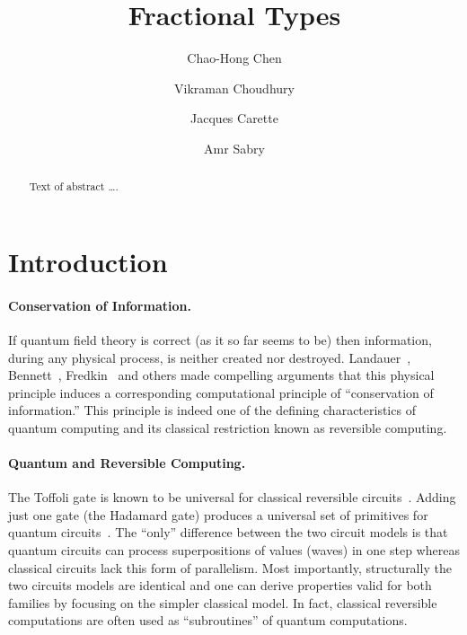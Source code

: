 \documentclass[sigplan,10pt,review,anonymous]{acmart}
\begin{document}
\title{Fractional Types}
\author{Chao-Hong Chen}

\author{Vikraman Choudhury}

\author{Jacques Carette}

\author{Amr Sabry}

\begin{abstract}
Text of abstract \ldots.
\end{abstract}

\maketitle



\section{Introduction}

\paragraph*{Conservation of Information.} If quantum field theory is
correct (as it so far seems to be) then information, during any
physical process, is neither created nor
destroyed. Landauer~\cite{Landauer:1961,Landauer,bennett1985fundamental},
Bennett~\cite{bennett2010notes,bennett2003notes,Bennett:1973:LRC},
Fredkin~\cite{fredkin1982conservative} and others made compelling
arguments that this physical principle induces a corresponding
computational principle of ``conservation of information.'' This
principle is indeed one of the defining characteristics of quantum
computing and its classical restriction known as reversible computing.

\paragraph*{Quantum and Reversible Computing.} The Toffoli gate is
known to be universal for classical reversible
circuits~\cite{Toffoli:1980}. Adding just one gate (the Hadamard gate)
produces a universal set of primitives for quantum
circuits~\cite{hadtoffuniv}. The ``only'' difference between the two
circuit models is that quantum circuits can process superpositions of
values (waves) in one step whereas classical circuits lack this form
of parallelism. Most importantly, structurally the two circuits models
are identical and one can derive properties valid for both families by
focusing on the simpler classical model. In fact, classical reversible
computations are often used as ``subroutines'' of quantum
computations.
\end{document}
